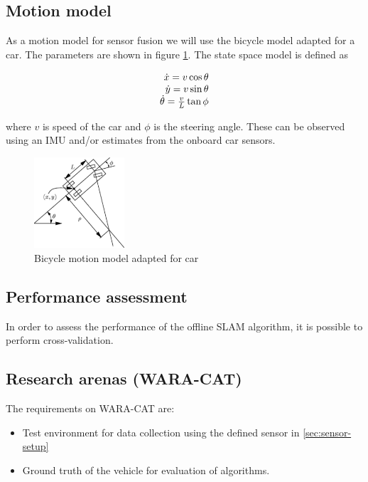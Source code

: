 \subsection{Motion model}
As a motion model for sensor fusion we will use the bicycle model adapted for a car.
The parameters are shown in figure \ref{fig:motion_model}. The state space model is defined as

\begin{equation}
 \begin{array}[b]{r}
  \dot{x} = v \cos \theta \\
  \dot{y} = v \sin \theta \\
  \dot{\theta} = \frac{v}{L} \tan{\phi}
 \end{array}
\end{equation}

where $v$ is speed of the car and $\phi$ is the steering angle. 
These can be observed using an IMU and/or estimates from the onboard car sensors.


\begin{figure}
\label{fig:motion_model}
\includegraphics[width=0.3\textwidth]{figures/bicycle_model.pdf}
\caption{Bicycle motion model adapted for car}
\end{figure}



\subsection{Performance assessment}

In order to assess the performance of the offline \gls{SLAM}
algorithm, it is possible to perform cross-validation.

\subsection{Research arenas (WARA-CAT)}


The requirements on WARA-CAT are:
\begin{itemize}
  \item Test environment for data collection using the defined sensor in
    \ref{sec:sensor-setup}
\item Ground truth of the vehicle for evaluation of algorithms.
\end{itemize}


